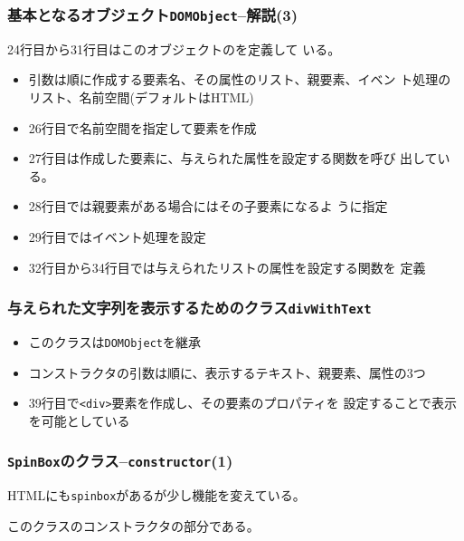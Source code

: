  \begin{frame}[containsverbatim]
  \frametitle{基本となるオブジェクト\texttt{DOMObject}--解説(3)}
 24行目から31行目はこのオブジェクトのを定義して
       いる。
       \begin{itemize}
        \item 引数は順に作成する要素名、その属性のリスト、親要素、イベン
              ト処理のリスト、名前空間(デフォルトはHTML)
        \item 26行目で名前空間を指定して要素を作成
        \item 27行目は作成した要素に、与えられた属性を設定する関数を呼び
              出している。
        \item 28行目では親要素がある場合にはその子要素になるよ
              うに指定
        \item 29行目ではイベント処理を設定
        \item 32行目から34行目では与えられたリストの属性を設定する関数を
              定義
       \end{itemize}
 \end{frame}
 \begin{frame}[containsverbatim]
  \frametitle{与えられた文字列を表示するためのクラス\texttt{divWithText}}
\begin{itemize}
 \item このクラスは\texttt{DOMObject}を継承
 \item コンストラクタの引数は順に、表示するテキスト、親要素、属性の3つ
 \item 39行目で\texttt{<div>}要素を作成し、その要素のプロパティを
       設定することで表示を可能としている
\end{itemize}
 \end{frame}
 \begin{frame}[containsverbatim]
  \frametitle{\texttt{SpinBox}のクラス--\texttt{constructor}(1)}
HTMLにも\texttt{spinbox}があるが少し機能を変えている。

  このクラスのコンストラクタの部分である。
 \end{frame}
